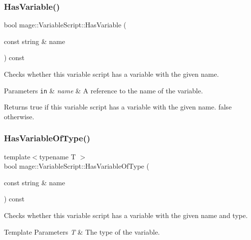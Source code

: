 \subsubsection{\texorpdfstring{Has\+Variable()}{HasVariable()}}
{\footnotesize\ttfamily bool mage\+::\+Variable\+Script\+::\+Has\+Variable (\begin{DoxyParamCaption}\item[{const string \&}]{name }\end{DoxyParamCaption}) const\hspace{0.3cm}{\ttfamily [noexcept]}}

Checks whether this variable script has a variable with the given name.


\begin{DoxyParams}[1]{Parameters}
\mbox{\tt in}  & {\em name} & A reference to the name of the variable. \\
\hline
\end{DoxyParams}
\begin{DoxyReturn}{Returns}
{\ttfamily true} if this variable script has a variable with the given name. {\ttfamily false} otherwise. 
\end{DoxyReturn}
\hypertarget{classmage_1_1_variable_script_af7eecc9edce0f8f9c91c4a1f631e8f69}{}\label{classmage_1_1_variable_script_af7eecc9edce0f8f9c91c4a1f631e8f69} 
\subsubsection{\texorpdfstring{Has\+Variable\+Of\+Type()}{HasVariableOfType()}}
{\footnotesize\ttfamily template$<$typename T $>$ \\
bool mage\+::\+Variable\+Script\+::\+Has\+Variable\+Of\+Type (\begin{DoxyParamCaption}\item[{const string \&}]{name }\end{DoxyParamCaption}) const\hspace{0.3cm}{\ttfamily [noexcept]}}

Checks whether this variable script has a variable with the given name and type.


\begin{DoxyTemplParams}{Template Parameters}
{\em T} & The type of the variable. \\
\hline
\end{DoxyTemplParams}

